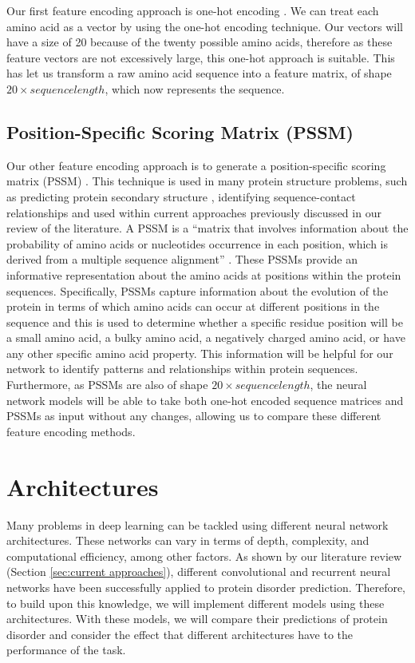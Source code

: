 \documentclass{l4proj}
\begin{document}
Our first feature encoding approach is one-hot encoding \citep{Fawcett:21}. We can treat each amino acid as a vector by using the one-hot encoding technique. Our vectors will have a size of 20 because of the twenty possible amino acids, therefore as these feature vectors are not excessively large, this one-hot approach is suitable. This has let us transform a raw amino acid sequence into a feature matrix, of shape $20 \times sequence length$, which now represents the sequence.

\subsection{Position-Specific Scoring Matrix (PSSM)}

Our other feature encoding approach is to generate a position-specific scoring matrix (PSSM) \citep{PSSM:wiki}. This technique is used in many protein structure problems, such as predicting protein secondary structure \citep{McGuffin:00}, identifying sequence-contact relationships \citep{Wang:17} and used within current approaches previously discussed in our review of the literature. A PSSM is a “matrix that involves information about the probability of amino acids or nucleotides occurrence in each position, which is derived from a multiple sequence alignment” \citep{Mohammadi:22}. These PSSMs provide an informative representation about the amino acids at positions within the protein sequences. Specifically, PSSMs capture information about the evolution of the protein in terms of which amino acids can occur at different positions in the sequence and this is used to determine whether a specific residue position will be a small amino acid, a bulky amino acid, a negatively charged amino acid, or have any other specific amino acid property. This information will be helpful for our network to identify patterns and relationships within protein sequences. Furthermore, as PSSMs are also of shape $20 \times sequence length$, the neural network models will be able to take both one-hot encoded sequence matrices and PSSMs as input without any changes, allowing us to compare these different feature encoding methods.

\section{Architectures}

Many problems in deep learning can be tackled using different neural network architectures. These networks can vary in terms of depth, complexity, and computational efficiency, among other factors. As shown by our literature review (Section \ref{sec:current approaches}), different convolutional and recurrent neural networks have been successfully applied to protein disorder prediction. Therefore, to build upon this knowledge, we will implement different models using these architectures. With these models, we will compare their predictions of protein disorder and consider the effect that different architectures have to the performance of the task.
\end{document}
